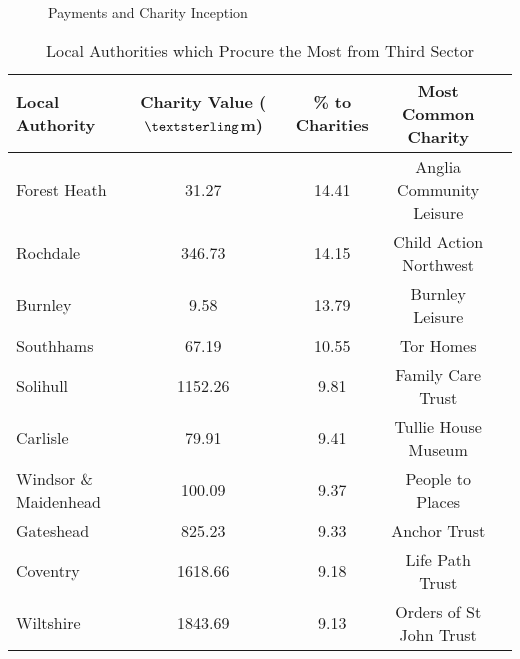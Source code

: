 \documentclass[11pt]{article}
\begin{document}
\begin{figure}[!t]
\centering
\caption{Payments and Charity Inception}\label{valuesinceinception}
	\datatablez
	\makeatletter
\end{figure}

\begin{table}[!b]
\centering
\caption{Local Authorities which Procure the Most from Third Sector}
\label{highestvalueLA}
\begin{tabular}{lcccc}
\toprule
Local Authority	&	Charity Value ($\textsterling$m)	&	\% to Charities	&	Most Common Charity\\  \midrule
Forest Heath	&	31.27	&	14.41	&	Anglia Community Leisure\\
Rochdale	&	346.73	&	14.15	&	Child Action Northwest\\
Burnley	&	9.58	&	13.79	&	Burnley Leisure\\
Southhams	&	67.19	&	10.55	&	Tor Homes\\
Solihull	&	1152.26	&	9.81	&	Family Care Trust\\
Carlisle	&	79.91	&	9.41	&	Tullie House Museum\\
Windsor \& Maidenhead	&	100.09	&	9.37	&	People to Places\\
Gateshead	&	825.23	&	9.33	&	Anchor Trust\\
Coventry	&	1618.66	&	9.18	&	Life Path Trust\\
Wiltshire	&	1843.69	&	9.13	&	Orders of St John Trust\\ \bottomrule
\end{tabular}
\end{table}
\end{document}
